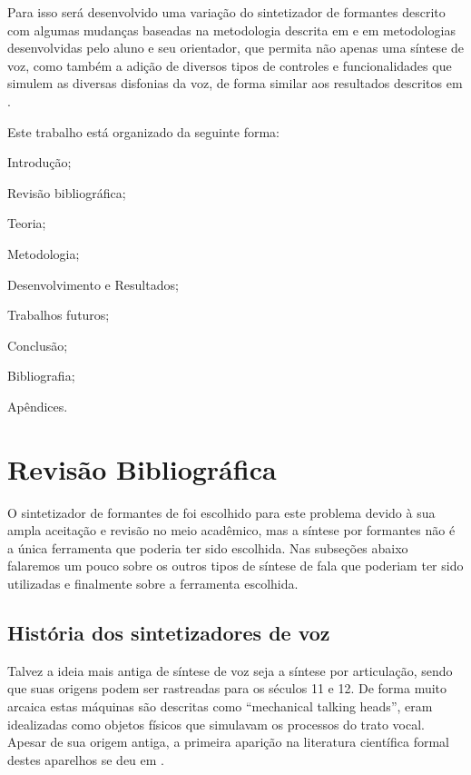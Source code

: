 \documentclass[
  12pt,       
  openright,      
  twoside,      
  a4paper,      
  english,      
  french,       
  spanish,      
  brazil,     
  ]{abntex2}
\begin{document}
Para isso será desenvolvido uma variação do sintetizador de formantes descrito  com algumas mudanças baseadas na metodologia descrita em  e em metodologias desenvolvidas pelo aluno e seu orientador, que permita não apenas uma síntese de voz, como também a adição de diversos tipos de controles e funcionalidades que simulem as diversas disfonias da voz, de forma similar aos resultados descritos em .

Este trabalho está organizado da seguinte forma: 
\begin{alineas}
\item Introdução;
\item Revisão bibliográfica;
\item Teoria;
\item Metodologia;
\item Desenvolvimento e Resultados;
\item Trabalhos futuros;
\item Conclusão;
\item Bibliografia;
\item Apêndices.
\end{alineas}

\chapter{Revisão Bibliográfica}
O sintetizador de formantes de  foi escolhido para este problema devido à sua ampla aceitação e revisão no meio acadêmico, mas a síntese por formantes não é a única ferramenta que poderia ter sido escolhida. Nas subseções abaixo falaremos um pouco sobre os outros tipos de síntese de fala que poderiam ter sido utilizadas e finalmente sobre a ferramenta escolhida.

\section{História dos sintetizadores de voz}
\label{subsec:historia}
Talvez a ideia mais antiga de síntese de voz seja a síntese por articulação, sendo que suas origens podem ser rastreadas para os séculos 11 e 12. De forma muito arcaica estas máquinas são descritas como ``mechanical talking heads'', eram idealizadas como objetos físicos que simulavam os processos do trato vocal. Apesar de sua origem antiga, a primeira aparição na literatura científica formal destes aparelhos  se deu em .
\end{document}
